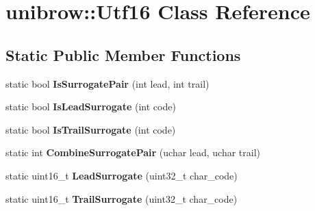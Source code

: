 \hypertarget{classunibrow_1_1_utf16}{}\section{unibrow\+:\+:Utf16 Class Reference}
\label{classunibrow_1_1_utf16}
\subsection*{Static Public Member Functions}
\begin{DoxyCompactItemize}
\item 
\hypertarget{classunibrow_1_1_utf16_a8ab0761452dd5c57d5a90c6af999b5d7}{}static bool {\bfseries Is\+Surrogate\+Pair} (int lead, int trail)\label{classunibrow_1_1_utf16_a8ab0761452dd5c57d5a90c6af999b5d7}

\item 
\hypertarget{classunibrow_1_1_utf16_ada29066756f075feb4786ec1b6d50f71}{}static bool {\bfseries Is\+Lead\+Surrogate} (int code)\label{classunibrow_1_1_utf16_ada29066756f075feb4786ec1b6d50f71}

\item 
\hypertarget{classunibrow_1_1_utf16_abb3a01f7302f952deaad31b667fd83a8}{}static bool {\bfseries Is\+Trail\+Surrogate} (int code)\label{classunibrow_1_1_utf16_abb3a01f7302f952deaad31b667fd83a8}

\item 
\hypertarget{classunibrow_1_1_utf16_aac66a94947867b52f783c206f7f798ac}{}static int {\bfseries Combine\+Surrogate\+Pair} (uchar lead, uchar trail)\label{classunibrow_1_1_utf16_aac66a94947867b52f783c206f7f798ac}

\item 
\hypertarget{classunibrow_1_1_utf16_a01bbf2bab943780510481b14565039b5}{}static uint16\+\_\+t {\bfseries Lead\+Surrogate} (uint32\+\_\+t char\+\_\+code)\label{classunibrow_1_1_utf16_a01bbf2bab943780510481b14565039b5}

\item 
\hypertarget{classunibrow_1_1_utf16_a867f66dde6dfd10126ed5dc997caee32}{}static uint16\+\_\+t {\bfseries Trail\+Surrogate} (uint32\+\_\+t char\+\_\+code)\label{classunibrow_1_1_utf16_a867f66dde6dfd10126ed5dc997caee32}

\end{DoxyCompactItemize}
